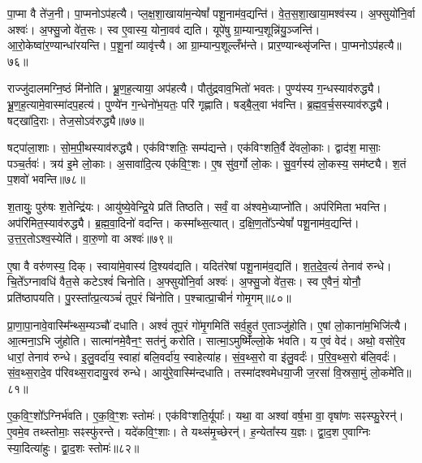 पा॒प्मा वै ते॑ज॒नी।
पा॒प्मनो\-ऽप॑हत्यै।
प्ल॒क्ष॒शा॒खाया॑म॒न्येषां᳚ पशू॒नाम॑व॒द्यन्ति॑।
वे॒त॒स॒शा॒खाया॒मश्व॑स्य।
अ॒फ्सुयो॑नि॒र्वा अश्वः॑।
अ॒फ्सु॒जो वे॑त॒सः।
स्व ए॒वास्य॒ योना॒वव॑ द्यति।
यूपे॑षु ग्रा॒म्यान्\-प॒शून्नि॑यु॒ञ्जन्ति॑।
आ॒रो॒केष्वा॑र॒ण्यान्धा॑रयन्ति।
प॒शू॒नां व्यावृ॑त्त्यै।
आ ग्रा॒म्यान्प॒शूल्लँभ॑न्ते।
प्रार॒ण्यान्थ्सृ॑जन्ति।
पा॒प्मनो\-ऽप॑हत्यै॥७६॥\ip\anuvakamend[अश्व॑स्य॒ व्यावृ॑त्त्यै॒ त्रीणि॑ च]

राज्जु॑दालमग्नि॒ष्ठं मि॑नोति।
भ्रू॒ण॒ह॒त्याया॒ अप॑हत्यै।
पौतु॑द्रवाव॒भितो॑ भवतः।
पुण्य॑स्य ग॒न्धस्या\-व॑\-रुद्ध्यै।
भ्रू॒ण॒ह॒त्या\-मे॒वा\-स्मा॑दप॒हत्य॑।
पुण्ये॑न ग॒न्धेनो॑भ॒यतः॒ परि॑ गृह्णाति।
षड्बै॒ल्॒वा भ॑वन्ति।
ब्र॒ह्म॒व॒र्च॒सस्या\-व॑\-रुद्ध्यै।
षट्खा॑दि॒राः।
तेज॒सो\-ऽव॑रुद्ध्यै॥७७॥\ip

षट्पा॑ला॒शाः।
सो॒म॒पी॒थस्या\-व॑\-रुद्ध्यै।
एक॑विꣳशतिः॒ सम्प॑द्यन्ते।
एक॑विꣳशति॒र्वै दे॑वलो॒काः।
द्वाद॑श॒ मासाः॒ पञ्च॒र्तवः॑।
त्रय॑ इ॒मे लो॒काः।
अ॒सावा॑दि॒त्य एक॑वि॒ꣳ॒शः।
ए॒ष सु॑व॒र्गो लो॒कः।
सु॒व॒र्गस्य॑ लो॒कस्य॒ सम॑ष्ट्यै।
श॒तं प॒शवो॑ भवन्ति॥७८॥\ip

श॒तायुः॒ पुरु॑षः श॒तेन्द्रि॑यः।
आयु॑ष्ये॒वेन्द्रि॒ये प्रति॑ तिष्ठति।
सर्वं॒ वा अ॑श्वमे॒ध्याप्नो॑ति।
अप॑रिमिता भवन्ति।
अप॑रिमित॒स्या\-व॑\-रुद्ध्यै।
ब्र॒ह्म॒वा॒दिनो॑ वदन्ति।
कस्मा᳚थ्स॒त्यात्।
द॒क्षि॒ण॒तो᳚\-ऽन्येषां᳚ पशू॒ना\-म॑व॒\-द्यन्ति॑।
उ॒त्त॒र॒तो\-ऽश्व॒स्येति॑।
वा॒रु॒णो वा अश्वः॑॥७९॥\ip

ए॒षा वै वरु॑णस्य॒ दिक्।
स्वाया॑मे॒वास्य॑ दि॒श्यव॑द्यति।
यदित॑रेषां पशू॒नाम॑व॒द्यति॑।
श॒त॒दे॒व॒त्यं॑ तेनाव॑ रुन्धे।
चि॒ते᳚\-ऽग्नावधि॑ वैत॒से कटे\-ऽश्वं॑ चिनोति।
अ॒फ्सुयो॑नि॒र्वा अश्वः॑।
अ॒फ्सु॒जो वे॑त॒सः।
स्व ए॒वैनं॒ योनौ॒ प्रति॑\-ष्ठापयति।
पु॒रस्ता᳚त्प्र॒त्यञ्चं॑ तूप॒रं चि॑नोति।
प॒श्चात्प्रा॒चीनं॑ गोमृ॒गम्॥८०॥\ip

प्रा॒णा॒पा॒नावे॒वास्मि᳚न्थ्स॒म्यञ्चौ॑ दधाति।
अश्वं॑ तूप॒रं गो॑मृ॒गमिति॑ सर्व॒हुत॑ ए॒ताञ्जु॑होति।
ए॒षां लो॒काना॑म॒भिजि॑त्यै।
आ॒त्मना॒ऽभि जु॑\-होति।
सात्मा॑नमे॒वैन॒ꣳ॒ सत॑नुं करोति।
सात्मा॒\-ऽमुष्मिँ॑ल्लो॒के भ॑वति।
य ए॒वं वेद॑।
अथो॒ वसो॑रे॒व धारां॒ तेनाव॑ रुन्धे।
इ॒लु॒\-वर्दा॑य॒ स्वाहा॑ बलि॒वर्दा॑य॒ स्वाहेत्या॑ह।
सं॒व॒थ्स॒रो वा इ॑लु॒वर्दः॑।
प॒रि॒\-व॒थ्स॒रो ब॑लि॒वर्दः॑।
सं॒व॒थ्स॒रा\-दे॒व प॑रि\-वथ्स॒रा\-दायु॒रव॑ रुन्धे।
आयु॑\-रे॒वा\-स्मि॑न्दधाति।
तस्मा॑दश्वमेधया॒जी ज॒रसा॑ वि॒स्रसा॒मुं लो॒कमे॑ति॥८१॥\ip\anuvakamend[तेज॒सो\-ऽव॑रुद्ध्यै भव॒न्त्यश्वो॑ गोमृ॒गमि॑लु॒वर्द॑श्च॒त्वारि॑ च]

ए॒क॒वि॒ꣳ॒शो᳚\-ऽग्निर्भ॑वति।
ए॒क॒वि॒ꣳ॒शः स्तोमः॑।
एक॑\-विꣳशति॒र्यूपाः᳚।
यथा॒ वा अश्वा॑ वर्\mbox{}ष॒भा वा॒ वृषा॑णः सꣴस्फु॒रेरन्॑।
ए॒वमे॒व तथ्स्तोमाः॒ सꣴस्फु॑रन्ते।
यदे॑कवि॒ꣳ॒शाः।
ते यथ्स॑मृ॒च्छेरन्॑।
ह॒न्येता᳚स्य य॒ज्ञः।
द्वा॒द॒श ए॒वाग्निः स्या॒दित्या॑हुः।
द्वा॒द॒शः स्तोमः॑॥८२॥\ip

